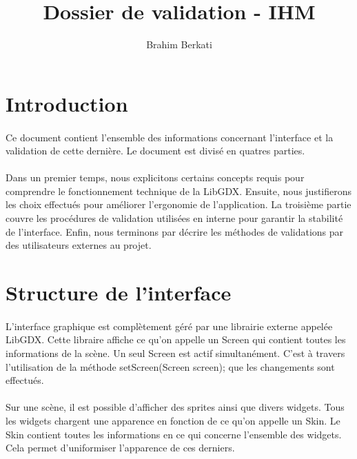 \documentclass[11pt]{article} %
\title{Dossier de validation - IHM}
\author{Brahim Berkati}
\begin{document}
\begin{sffamily} 
\maketitle

\section{Introduction}
\paragraph{}
Ce document contient l'ensemble des informations concernant l'interface et la validation de cette dernière. Le document est divisé en quatres parties.
\paragraph{}
Dans un premier temps, nous explicitons certains concepts requis pour comprendre le fonctionnement technique de la LibGDX. Ensuite, nous justifierons les choix effectués pour améliorer l'ergonomie de l'application. La troisième partie couvre les procédures de validation utilisées en interne pour garantir la stabilité de l'interface. Enfin, nous terminons par décrire les méthodes de validations par des utilisateurs externes au projet.

\section{Structure de l'interface}
\paragraph{}
L'interface graphique est complètement géré par une librairie externe appelée LibGDX. Cette libraire affiche ce qu'on appelle un Screen qui contient toutes les informations de la scène. Un seul Screen est actif simultanément. C'est à travers l'utilisation de la méthode setScreen(Screen screen); que les changements sont effectués.
\paragraph{}
Sur une scène, il est possible d'afficher des sprites ainsi que divers widgets. Tous les widgets chargent une apparence en fonction de ce qu'on appelle un Skin. Le Skin contient toutes les informations en ce qui concerne l'ensemble des widgets. Cela permet d'uniformiser l'apparence de ces derniers.

\end{sffamily}
\end{document}

